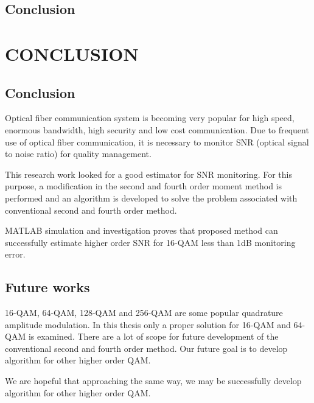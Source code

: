 \documentclass[12pt]{report}
\begin{document}
\section{Conclusion}
\fi


\chapter{CONCLUSION}
\section{Conclusion}
Optical fiber communication system is becoming very popular for high speed, enormous bandwidth, high security and low cost communication. Due to frequent use of optical fiber communication, it is necessary to monitor SNR (optical signal to noise ratio) for quality management. 

This research work looked for a good estimator for SNR monitoring. For this purpose, a modification in the second and fourth order moment method is performed and an algorithm is developed to solve the problem associated with conventional second and fourth order method. 

MATLAB simulation and investigation proves that proposed method can successfully estimate higher order SNR for 16-QAM less than 1dB monitoring error.

\section{Future works}
16-QAM, 64-QAM, 128-QAM and 256-QAM are some popular quadrature amplitude modulation. In this thesis only a proper solution for 16-QAM and 64-QAM is examined. There are a lot of scope for future development of the conventional second and fourth order method. Our future goal is to develop algorithm for other higher order QAM.

We are hopeful that approaching the same way, we may be successfully develop algorithm for other higher order QAM.
\end{document}
